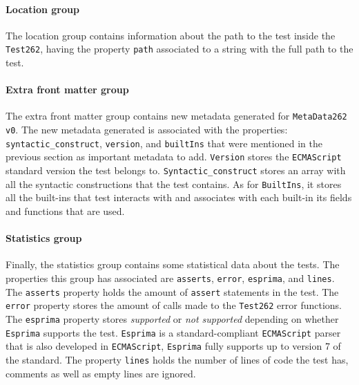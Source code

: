 \documentclass[runningheads]{llncs}
\begin{document}
\paragraph{Location group}
The location group contains information about the path to the test inside the \texttt{Test262}, having the property \texttt{path} associated to a string with the full path to the test.


\paragraph{Extra front matter group}
The extra front matter group contains new metadata generated for \texttt{MetaData262 v0}. The new metadata generated is associated with the properties: \texttt{syntactic\_construct}, \texttt{version}, and \texttt{builtIns} that were mentioned in the previous section as important metadata to add. \texttt{Version} stores the \texttt{ECMAScript} standard version the test belongs to. \texttt{Syntactic\_construct} stores an array with all the syntactic constructions that the test contains. As for \texttt{BuiltIns}, it stores all the built-ins that test interacts with and associates with each built-in its fields and functions that are used.


\paragraph{Statistics group}
Finally, the statistics group contains some statistical data about the tests. The properties this group has associated are \texttt{asserts}, \texttt{error}, \texttt{esprima}, and \texttt{lines}. The \texttt{asserts} property holds the amount of \texttt{assert} statements in the test. The \texttt{error} property stores the amount of calls made to the \texttt{Test262} error functions. The \texttt{esprima} property stores \emph{supported} or \emph{not supported} depending on whether \texttt{Esprima}\cite{Esprima} supports the test. \texttt{Esprima} is a standard-compliant \texttt{ECMAScript} parser that is also developed in \texttt{ECMAScript}, \texttt{Esprima} fully supports up to version 7 of the standard. The property \texttt{lines} holds the number of lines of code the test has, comments as well as empty lines are ignored.
\end{document}
